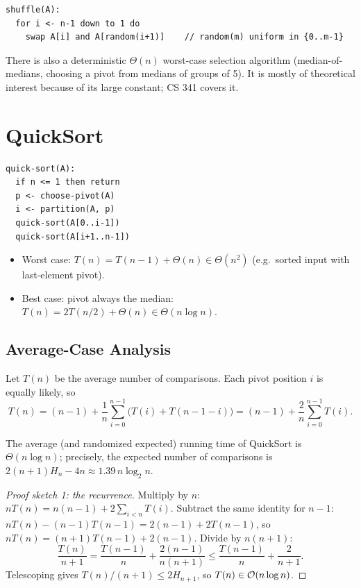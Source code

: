 \begin{lstlisting}
shuffle(A):
  for i <- n-1 down to 1 do
    swap A[i] and A[random(i+1)]    // random(m) uniform in {0..m-1}
\end{lstlisting}

\begin{aside}
There is also a deterministic $\Theta(n)$ worst-case selection algorithm
(median-of-medians, choosing a pivot from medians of groups of 5). It is mostly
of theoretical interest because of its large constant; CS 341 covers it.
\end{aside}

\section{QuickSort}

\begin{lstlisting}
quick-sort(A):
  if n <= 1 then return
  p <- choose-pivot(A)
  i <- partition(A, p)
  quick-sort(A[0..i-1])
  quick-sort(A[i+1..n-1])
\end{lstlisting}

\begin{itemize}
  \item Worst case: $T(n) = T(n-1) + \Theta(n) \in \Theta(n^2)$ (e.g.\ sorted
        input with last-element pivot).
  \item Best case: pivot always the median: $T(n) = 2T(n/2) + \Theta(n) \in
        \Theta(n \log n)$.
\end{itemize}

\subsection{Average-Case Analysis}

Let $T(n)$ be the average number of comparisons. Each pivot position $i$ is
equally likely, so
\[
T(n) = (n - 1) + \frac1n \sum_{i=0}^{n-1} \big(T(i) + T(n-1-i)\big)
     = (n-1) + \frac2n \sum_{i=0}^{n-1} T(i).
\]

\begin{theorem}
The average (and randomized expected) running time of QuickSort is
$\Theta(n \log n)$; precisely, the expected number of comparisons is
$2(n+1)H_n - 4n \approx 1.39\, n \log_2 n$.
\end{theorem}

\begin{proof}[Proof sketch 1: the recurrence]
Multiply by $n$: $nT(n) = n(n-1) + 2\sum_{i<n} T(i)$. Subtract the same identity
for $n-1$: $nT(n) - (n-1)T(n-1) = 2(n-1) + 2T(n-1)$, so
$nT(n) = (n+1)T(n-1) + 2(n-1)$. Divide by $n(n+1)$:
\[
\frac{T(n)}{n+1} = \frac{T(n-1)}{n} + \frac{2(n-1)}{n(n+1)}
\le \frac{T(n-1)}{n} + \frac{2}{n+1}.
\]
Telescoping gives $T(n)/(n+1) \le 2 H_{n+1}$, so $T(n) \in \mathcal{O}(n\log n)$.
\end{proof}

